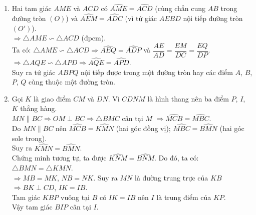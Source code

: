 \begin{ex}
{\begin{enumerate}
        		Suy ra $\widehat{MAN}+\widehat{MBN}=\widehat{MAN}+\widehat{ABM}+\widehat{ABN}=\widehat{MAN}+\widehat{IMA}+\widehat{INA}=180^\circ$ (tổng ba góc trong một tam giác).\\
        		Hai tam giác $IMA$ và $IBM$ có $\widehat{IMA}=\widehat{ABM}$ (cmt) và $\widehat{BIM}$ chung.\\
        		$\Rightarrow \triangle IMA \backsim \triangle IBM$ $\Rightarrow \dfrac{IM}{IB}=\dfrac{IA}{IM}$ $\Rightarrow IM^2=IA.IB$.\\
        		Tương tự, ta có: $\triangle INA \backsim \triangle IBN \Rightarrow IN^2=IA.IB$.\\
        		Do đó, ta có: $IM=IN$ hay $I$ là trung điểm của $MN$.
        \item Hai tam giác $AME$ và $ACD$ có $\widehat{AME}=\widehat{ACD}$ (cùng chắn cung $AB$ trong đường tròn $(O)$) và $\widehat{AEM}=\widehat{ADC}$ (vì tứ giác $AEBD$ nội tiếp đường tròn $(O')$).\\
        		$\Rightarrow \triangle AME \backsim \triangle ACD$ (đpcm).\\
        		Ta có: $\triangle AME \backsim \triangle ACD \Rightarrow \widehat{AEQ}=\widehat{ADP}$ và $\dfrac{AE}{AD}=\dfrac{EM}{DC}=\dfrac{EQ}{DP}$.\\
        		$\Rightarrow \triangle AQE \backsim \triangle APD \Rightarrow \widehat{AQE}=\widehat{APD}$.\\
        		Suy ra tứ giác $ABPQ$ nội tiếp được trong một đường tròn hay các điểm $A$, $B$, $P$, $Q$ cùng thuộc một đường tròn.
        \item Gọi $K$ là giao điểm $CM$ và $DN$. Vì $CDNM$ là hình thang nên ba điểm $P$, $I$, $K$ thẳng hàng.\\
        		$MN \parallel BC \Rightarrow OM \perp BC \Rightarrow \triangle BMC$ cân tại $M$ $\Rightarrow \widehat{MCB}=\widehat{MBC}$.\\
        		Do $MN \parallel BC$ nên $\widehat{MCB}=\widehat{KMN}$ (hai góc đồng vị); $\widehat{MBC}=\widehat{BMN}$ (hai góc sole trong).\\
        		Suy ra $\widehat{KMN}=\widehat{BMN}$.\\
        		Chứng minh tương tự, ta được $\widehat{KNM}=\widehat{BNM}$. Do đó, ta có: $\triangle BMN=\triangle KMN$.\\
        		$\Rightarrow MB=MK$, $NB=NK$. Suy ra $MN$ là đường trung trực của $KB$ $\Rightarrow BK \perp CD$, $IK=IB$.\\
        		Tam giác $KBP$ vuông tại $B$ có $IK=IB$ nên $I$ là trung điểm của $KP$.\\
        		Vậy tam giác $BIP$ cân tại $I$.
    \end{enumerate}
    }
\end{ex}

